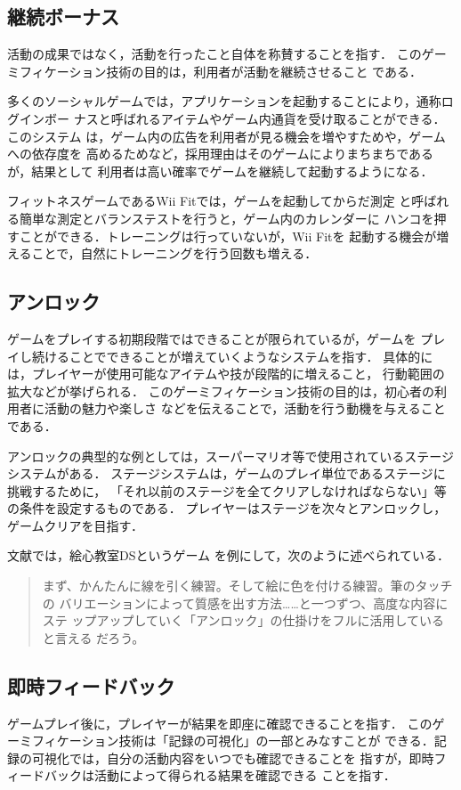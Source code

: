 \documentclass{jreport}
\begin{document}
\subsection{継続ボーナス}
活動の成果ではなく，活動を行ったこと自体を称賛することを指す．
このゲーミフィケーション技術の目的は，利用者が活動を継続させること
である．

多くのソーシャルゲームでは，アプリケーションを起動することにより，通称ログインボー
ナスと呼ばれるアイテムやゲーム内通貨を受け取ることができる．このシステム
は，ゲーム内の広告を利用者が見る機会を増やすためや，ゲームへの依存度を
高めるためなど，採用理由はそのゲームによりまちまちであるが，結果として
利用者は高い確率でゲームを継続して起動するようになる．

フィットネスゲームであるWii Fitでは，ゲームを起動してからだ測定
と呼ばれる簡単な測定とバランステストを行うと，ゲーム内のカレンダーに
ハンコを押すことができる．トレーニングは行っていないが，Wii Fitを
起動する機会が増えることで，自然にトレーニングを行う回数も増える．

\subsection{アンロック}
ゲームをプレイする初期段階ではできることが限られているが，ゲームを
プレイし続けることでできることが増えていくようなシステムを指す．
具体的には，プレイヤーが使用可能なアイテムや技が段階的に増えること，
行動範囲の拡大などが挙げられる．
このゲーミフィケーション技術の目的は，初心者の利用者に活動の魅力や楽しさ
などを伝えることで，活動を行う動機を与えることである．

アンロックの典型的な例としては，スーパーマリオ等で使用されているステージシステムがある．
ステージシステムは，ゲームのプレイ単位であるステージに挑戦するために，
「それ以前のステージを全てクリアしなければならない」等の条件を設定するものである．
プレイヤーはステージを次々とアンロックし，ゲームクリアを目指す．

文献\cite{Inoue:Gamification}では，絵心教室DSというゲーム
を例にして，次のように述べられている．

\begin{quote}
  まず、かんたんに線を引く練習。そして絵に色を付ける練習。筆のタッチの
  バリエーションによって質感を出す方法……と一つずつ、高度な内容にステ
  ップアップしていく「アンロック」の仕掛けをフルに活用していると言える
  だろう。\cite{Inoue:Gamification}
\end{quote}

\subsection{即時フィードバック}
ゲームプレイ後に，プレイヤーが結果を即座に確認できることを指す．
このゲーミフィケーション技術は「記録の可視化」の一部とみなすことが
できる．記録の可視化では，自分の活動内容をいつでも確認できることを
指すが，即時フィードバックは活動によって得られる結果を確認できる
ことを指す．
\end{document}
